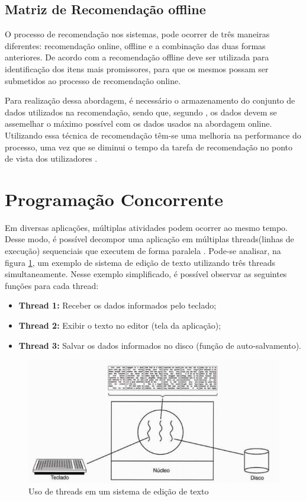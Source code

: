 \subsection{Matriz de Recomendação offline}

O processo de recomendação nos sistemas, pode ocorrer de três maneiras diferentes: recomendação online, offline e a combinação das duas formas anteriores. De acordo com  a recomendação offline deve ser utilizada para identificação dos itens mais promissores, para que os mesmos possam ser submetidos ao processo de recomendação online.

Para realização dessa abordagem, é necessário o armazenamento do conjunto de dados utilizados na recomendação, sendo que, segundo , os dados devem se assemelhar o máximo possível com os dados usados na abordagem online. Utilizando essa técnica de recomendação têm-se uma melhoria na performance do processo, uma vez que se diminui o tempo da tarefa de recomendação no ponto de vista dos utilizadores \cite{moreira2019sistema}.

\section{Programação Concorrente}

Em diversas aplicações, múltiplas atividades podem ocorrer ao mesmo tempo. Desse modo, é possível decompor uma aplicação em múltiplas threads(linhas de execução) sequenciais que executem de forma paralela \cite{tanenbaum2015modern}. Pode-se analisar, na figura \ref{fig:threads}, um exemplo de sistema de edição de texto utilizando três threads simultaneamente. Nesse exemplo simplificado, é possível observar as seguintes funções para cada thread:

\begin{itemize}
    \item \textbf{Thread 1:} Receber os dados informados pelo teclado;
    \item \textbf{Thread 2:} Exibir o texto no editor (tela da aplicação);
    \item \textbf{Thread 3:} Salvar os dados informados no disco (função de auto-salvamento).
\end{itemize}

\begin{figure}[H]
		\centering
		\includegraphics[width=0.8\linewidth]{imagens/threads.png}
		\caption[Uso de threads em um sistema de edição de texto]{Uso de threads em um sistema de edição de texto \cite{tanenbaum2007distributed}}
		\label{fig:threads}
	\end{figure}

